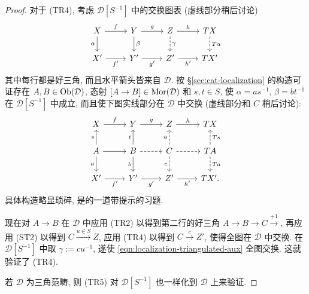\begin{proof}
	对于 (TR4), 考虑 $\mathcal{D}[S^{-1}]$ 中的交换图表 (虚线部分稍后讨论)
	\begin{equation}\label{eqn:localization-triangulated-aux}\begin{tikzcd}
		X \arrow[r, "f"] \arrow[d, "\alpha"'] & Y \arrow[r, "g"] \arrow[d, "\beta"] & Z \arrow[r, "h"] \arrow[dashed, d, "\gamma"] & TX \arrow[dashed, d, "T\alpha"] \\
		X' \arrow[r, "{f'}"'] & Y' \arrow[r, "{g'}"'] & Z' \arrow[r, "{h'}"'] & T X'
	\end{tikzcd}\end{equation}
	其中每行都是好三角, 而且水平箭头皆来自 $\mathcal{D}$. 按 \S\ref{sec:cat-localization} 的构造可证存在 $A, B \in \operatorname{Ob}(\mathcal{D})$, 态射 $[A \to B] \in \operatorname{Mor}(\mathcal{D})$ 和 $s, t \in S$, 使 $\alpha = as^{-1}$, $\beta = bt^{-1}$ 在 $\mathcal{D}[S^{-1}]$ 中成立, 而且使下图实线部分在 $\mathcal{D}$ 中交换 (虚线部分和 $C$ 稍后讨论):
	\[\begin{tikzcd}
		X \arrow[r, "f"] & Y \arrow[r, "g"] & Z \arrow[r, "h"] & TX \\
		A \arrow[u, "s"] \arrow[d, "a"'] \arrow[r] & B \arrow[u, "t"] \arrow[d, "b"'] \arrow[dashed, r] & C \arrow[dashed, u, "u"] \arrow[dashed, r] \arrow[dashed, d, "c"'] & TA \arrow[dashed, u, "Ts"'] \arrow[dashed, d, "Ta"] \\
		X' \arrow[r, "{f'}"'] & Y' \arrow[r, "{g'}"'] & Z' \arrow[r, "{h'}"'] & T X' .
	\end{tikzcd}\]
	具体构造略显琐碎, 是的一道带提示的习题.

	现在对 $A \to B$ 在 $\mathcal{D}$ 中应用 (TR2) 以得到第二行的好三角 $A \to B \to C \xrightarrow{+1}$, 再应用 (ST2) 以得到 $C \xrightarrow{u \in S} Z$, 应用 (TR4) 以得到 $C \xrightarrow{c} Z'$, 使得全图在 $\mathcal{D}$ 中交换. 在 $\mathcal{D}[S^{-1}]$ 中取 $\gamma := c u^{-1}$, 遂使 \eqref{eqn:localization-triangulated-aux} 全图交换. 这就验证了 (TR4).
	
	若 $\mathcal{D}$ 为三角范畴, 则 (TR5) 对 $\mathcal{D}[S^{-1}]$ 也一样化到 $\mathcal{D}$ 上来验证.
\end{proof}

